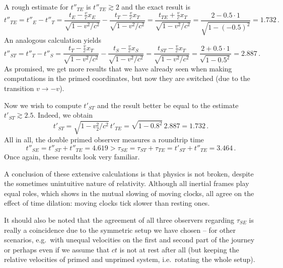 \begin{ex}
\begin{itemize}
	A rough estimate for $t''_{TE}$ is $t''_{TE} \gtrsim 2$ and the exact result is
	\begin{equation*}
	t''_{TE} = t''_E - t''_T = \frac{t_E - \frac{v}{c} x_E}{\sqrt{1 - v^2 / c^2}} - \frac{t_T - \frac{v}{c} x_T}{\sqrt{1 - v^2 / c^2}} = \frac{t_{TE} + \frac{v}{c} x_T}{\sqrt{1 - v^2 / c^2}} = \frac{2 - 0.5 \cdot 1}{\sqrt{1 - (-0.5)^2}} = 1.732 \, .
	\end{equation*}
	An analogous calculation yields
	\begin{equation*}
	t''_{ST} = t''_T - t''_S = \frac{t_T - \frac{v}{c} x_T}{\sqrt{1 - v^2 / c^2}} - \frac{t_S - \frac{v}{c} x_S}{\sqrt{1 - v^2 / c^2}} = \frac{t_{ST} - \frac{v}{c} x_T}{\sqrt{1 - v^2 / c^2}} = \frac{2 + 0.5 \cdot 1}{\sqrt{1 - 0.5^2}} = 2.887 \, .
	\end{equation*}
	As promised, we get more results that we have already seen when making computations in the primed coordinates, but now they are switched (due to the transition $v \rightarrow -v$).

	Now we wish to compute $t'_{ST}$ and the result better be equal to the estimate $t'_{ST} \gtrsim 2.5$. Indeed, we obtain
	\begin{equation*}
	t'_{ST} = \sqrt{1 - v_2^2 / c^2} \, t'_{TE} = \sqrt{1 - 0.8^2} \, 2.887 = 1.732 \, .
	\end{equation*}
	All in all, the double primed observer measures a roundtrip time
	\begin{equation*}
	t''_{SE} = t''_{ST} + t''_{TE} = 4.619 > \tau_{SE} = \tau_{ST} + \tau_{TE} = t'_{ST} + t''_{TE} = 3.464 \, .
	\end{equation*}
	Once again, these results look very familiar. 
\end{itemize}

A conclusion of these extensive calculations is that physics is not broken, despite the sometimes unintuitive nature of relativity. Although all inertial frames play equal roles, which shows in the mutual slowing of moving clocks, all agree on the effect of time dilation: moving clocks tick slower than resting ones.

It should also be noted that the agreement of all three observers regarding $\tau_{SE}$ is really a coincidence due to the symmetric setup we have chosen -- for other scenarios, e.g.~with unequal velocities on the first and second part of the journey or perhaps even if we assume that $ct$ is not at rest after all (but keeping the relative velocities of primed and unprimed system, i.e.~rotating the whole setup).
\end{ex}


